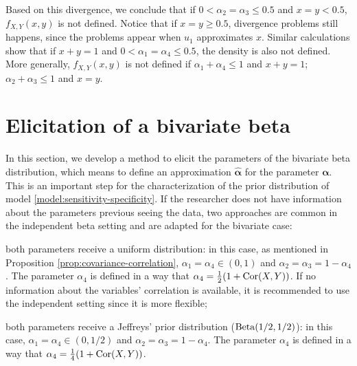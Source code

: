 Based on this divergence, we conclude that if $0 < \alpha_2 = \alpha_3 \le 0.5$
and $x = y < 0.5$, $f_{X,Y}(x,y)$ is not defined. Notice that if $x = y \ge
0.5$, divergence problems still happens, since the problems appear when $u_1$ approximates $x$. Similar calculations show that if $x + y = 1$ and $0 < \alpha_1 = \alpha_4 \le 0.5$, the density is also
not defined. More generally, $f_{X,Y}(x,y)$ is not defined if $\alpha_1 +
\alpha_4 \le 1$ and $x + y = 1$; $\alpha_2 + \alpha_3 \le 1$ and $x = y$.

\section{Elicitation of a bivariate beta}
\label{sec:elicitation-bivariate-beta}

In this section, we develop a method to elicit the parameters of the bivariate
beta distribution, which means to define an approximation
$\hat{\boldsymbol{\alpha}}$ for the parameter $\boldsymbol{\alpha}$. 
This is an important step for the characterization of the prior distribution of model
\eqref{model:sensitivity-specificity}. If the researcher does not have
information about the parameters previous seeing the data, two approaches
are common in the independent beta setting and are adapted for the bivariate 
case:

\begin{alineas}
  \item both parameters receive a uniform distribution: in this case, as
  mentioned in Proposition \ref{prop:covariance-correlation}, $\alpha_1 =
  \alpha_4 \in (0,1)$ and $\alpha_2 = \alpha_3 = 1 - \alpha_4$. The parameter
  $\alpha_4$ is defined in a way that $\alpha_4 = \frac{1}{2}(1 + \operatorname{Cor}(X,Y))$.
  If no information about the variables' correlation is available, it is recommended to use
  the independent setting since it is more flexible;
  \item both parameters receive a Jeffreys' prior distribution
  ($\operatorname{Beta}(1/2,1/2)$): in this case,  $\alpha_1 =
  \alpha_4 \in (0,1/2)$ and $\alpha_2 = \alpha_3 = 1 - \alpha_4$. The parameter
  $\alpha_4$ is defined in a way that $\alpha_4 = \frac{1}{4}(1 + \operatorname{Cor}(X,Y))$.
\end{alineas}

